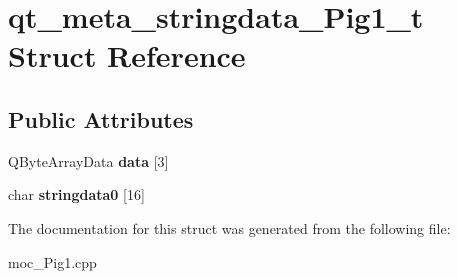 \hypertarget{structqt__meta__stringdata__Pig1__t}{}\section{qt\+\_\+meta\+\_\+stringdata\+\_\+\+Pig1\+\_\+t Struct Reference}
\label{structqt__meta__stringdata__Pig1__t}
\subsection*{Public Attributes}
\begin{DoxyCompactItemize}
\item 
Q\+Byte\+Array\+Data {\bfseries data} \mbox{[}3\mbox{]}\hypertarget{structqt__meta__stringdata__Pig1__t_a9a0f889d4de9ec3119b634b046e99dea}{}\label{structqt__meta__stringdata__Pig1__t_a9a0f889d4de9ec3119b634b046e99dea}

\item 
char {\bfseries stringdata0} \mbox{[}16\mbox{]}\hypertarget{structqt__meta__stringdata__Pig1__t_a02a1f04f4c5220854eeee79857d219d6}{}\label{structqt__meta__stringdata__Pig1__t_a02a1f04f4c5220854eeee79857d219d6}

\end{DoxyCompactItemize}


The documentation for this struct was generated from the following file\+:\begin{DoxyCompactItemize}
\item 
moc\+\_\+\+Pig1.\+cpp\end{DoxyCompactItemize}
